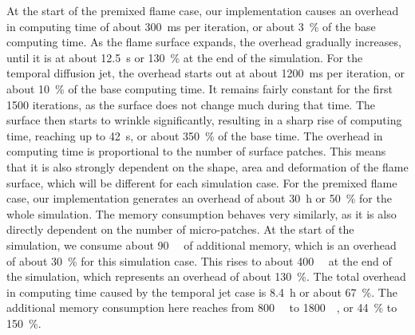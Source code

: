 %
At the start of the premixed flame case, our implementation causes an overhead
in computing time of about \SI{300}{\milli\second} per iteration, or about
\SI{3}{\percent} of the base computing time.
%
As the flame surface expands, the overhead gradually increases, until it is at
about \SI{12.5}{\second} or \SI{130}{\percent} at the end of the simulation.
%
For the temporal diffusion jet, the overhead starts out at about
\SI{1200}{\milli\second} per iteration, or about \SI{10}{\percent} of the base
computing time.
%
It remains fairly constant for the first \num{1500} iterations, as the surface
does not change much during that time.
%
The surface then starts to wrinkle significantly, resulting in a sharp rise of
computing time, reaching up to \SI{42}{\second}, or about \SI{350}{\percent} of
the base time.
%
The overhead in computing time is proportional to the number of surface patches.
%
This means that it is also strongly dependent on the shape, area and deformation
of the flame surface, which will be different for each simulation case.
%
For the premixed flame case, our implementation generates an overhead of about
\SI{30}{\hour} or \SI{50}{\percent} for the whole simulation.
%
The memory consumption behaves very similarly, as it is also directly dependent
on the number of micro-patches.
%
At the start of the simulation, we consume about \SI{90}{\giga\byte} of
additional memory, which is an overhead of about \SI{30}{\percent} for this
simulation case.
%
This rises to about \SI{400}{\giga\byte} at the end of the simulation, which
represents an overhead of about \SI{130}{\percent}.
%
The total overhead in computing time caused by the temporal jet case is
\SI{8.4}{\hour} or about \SI{67}{\percent}.
%
The additional memory consumption here reaches from \SI{800}{\giga\byte} to
\SI{1800}{\giga\byte}, or \SI{44}{\percent} to \SI{150}{\percent}.
%

